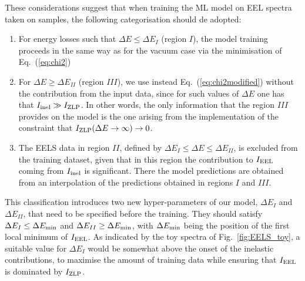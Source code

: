 These considerations suggest that when training the ML model on EEL spectra taken on samples,
the following categorisation should de adopted:

\begin{enumerate}

\item For energy losses such that $\Delta E \le \Delta E_I$ (region $I$),
  the model training  proceeds in the same way as for the vacuum case
  via the minimisation of Eq.~(\ref{eq:chi2})

\item  
  For $\Delta E \ge \Delta E_{II}$ (region $III$), we use instead Eq.~(\ref{eq:chi2modified})
  without the contribution from the input data, since for such values
  of $\Delta E$ one has that $I_{\rm inel}\gg I_{\rm ZLP}$.
  In other words, the only information that the region $III$ provides
  on the model is the one arising from the implementation
  of the constraint that $I_{\rm ZLP}(\Delta E\to \infty)\to 0$.

\item The EELS data  in region $II$, defined by  $\Delta E_I \le \Delta E \le \Delta E_{II}$,
  is excluded from the training dataset, given that in this region the contribution to $I_{\rm EEL}$
  coming from $I_{\rm inel}$ is significant.
  There the model predictions are obtained from an interpolation
  of the predictions obtained in regions $I$ and $III$.

\end{enumerate}

This classification introduces two new hyper-parameters of our model, $\Delta E_I$ and
$\Delta E_{II}$, that need to be specified before the training.
%
They should satisfy $\Delta E_I \le \Delta E_{\rm min}$ and $\Delta E_{II} \ge \Delta E_{\rm min}$,
with $\Delta E_{\rm min}$ being the position of the first local minimum of $I_{\rm EEL}$.
%
As indicated by the toy spectra of Fig.~\ref{fig:EELS_toy}, a suitable value for $\Delta E_{I}$
would be somewhat above the onset of the inelastic contributions, to maximise
the amount of training data while ensuring that $I_{\rm EEL}$ is dominated
by $I_{\rm ZLP}$.

